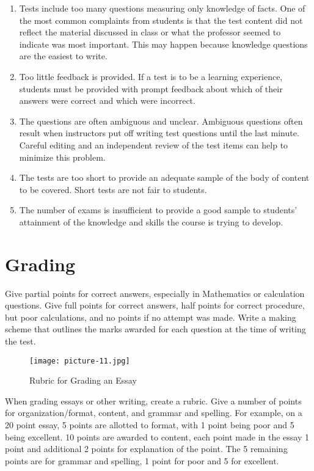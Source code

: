 \begin{enumerate}
 \item Tests include too many questions measuring only knowledge of facts. One of the most common complaints from students is that the test content did not reflect the material discussed in class or what the professor seemed to indicate was most important. This may happen because knowledge questions are the easiest to write.
 \item Too little feedback is provided. If a test is to be a learning experience, students must be provided with prompt feedback about which of their answers were correct and which were incorrect.
 \item The questions are often ambiguous and unclear.  Ambiguous questions often result when instructors put off writing test questions until the last minute. Careful editing and an independent review of the test items can help to minimize this problem.
 \item The tests are too short to provide an adequate sample of the body of content to be covered. Short tests are not fair to students.
 \item The number of exams is insufficient to provide a good sample to students' attainment of the knowledge and skills the course is trying to develop. 
\end{enumerate}

\section{Grading}

Give partial points for correct answers, especially in Mathematics or calculation questions.  Give full points for correct answers, half points for correct procedure, but poor calculations, and no points if no attempt was made.  Write a making scheme that outlines the marks awarded for each question at the time of writing the test.

\begin{figure}[h!]
\begin{center}
\texttt{[image: picture-11.jpg]} 
\caption{Rubric for Grading an Essay}
\end{center}
\end{figure}

When grading essays or other writing, create a rubric.  Give a number of points for organization/format, content, and grammar and spelling.  For example, on a 20 point essay, 5 points are allotted to format, with 1 point being poor and 5 being excellent.  10 points are awarded to content, each point made in the essay 1 point and additional 2 points for explanation of the point.  The 5 remaining points are for grammar and spelling, 1 point for poor and 5 for excellent.


